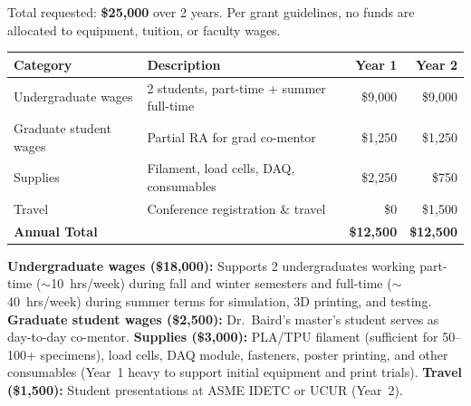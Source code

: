 
Total requested: \textbf{\$25,000} over 2 years.  Per grant guidelines, no
funds are allocated to equipment, tuition, or faculty wages.

\begin{center}
{\small
\begin{tabular}{@{}llrr@{}}
\toprule
\textbf{Category} & \textbf{Description} & \textbf{Year 1} & \textbf{Year 2} \\
\midrule
Undergraduate wages
    & 2 students, part-time + summer full-time
    & \$9,000 & \$9,000 \\
Graduate student wages
    & Partial RA for grad co-mentor
    & \$1,250 & \$1,250 \\
Supplies
    & Filament, load cells, DAQ, consumables
    & \$2,250 & \$750 \\
Travel
    & Conference registration \& travel
    & \$0 & \$1,500 \\
\midrule
\textbf{Annual Total} & & \textbf{\$12,500} & \textbf{\$12,500} \\
\bottomrule
\end{tabular}
}
\end{center}

\textbf{Undergraduate wages (\$18,000):} Supports 2 undergraduates working
part-time ($\sim$10~hrs/week) during fall and winter semesters and
full-time ($\sim$40~hrs/week) during summer terms for simulation,
3D printing, and testing.
%
\textbf{Graduate student wages (\$2,500):} Dr.~Baird's master's student
serves as day-to-day co-mentor.
%
\textbf{Supplies (\$3,000):} PLA/TPU filament (sufficient for 50--100+
specimens), load cells, DAQ module, fasteners, poster printing, and other
consumables (Year~1 heavy to support initial equipment and print trials).
%
\textbf{Travel (\$1,500):} Student presentations at ASME IDETC or UCUR
(Year~2).
